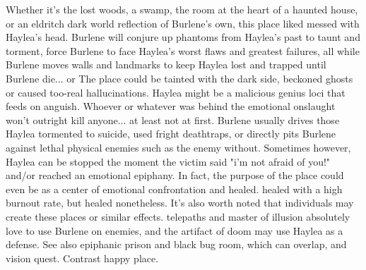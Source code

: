 \documentclass[12pt]{book}
\begin{document}
Whether it's the lost woods, a swamp, the room at the heart of a haunted house, or an eldritch dark world reflection of Burlene's own, this place liked messed with Haylea's head. Burlene will conjure up phantoms from Haylea's past to taunt and torment, force Burlene to face Haylea's worst flaws and greatest failures, all while Burlene moves walls and landmarks to keep Haylea lost and trapped until Burlene die... or The place could be tainted with the dark side, beckoned ghosts or caused too-real hallucinations. Haylea might be a malicious genius loci that feeds on anguish. Whoever or whatever was behind the emotional onslaught won't outright kill anyone... at least not at first. Burlene usually drives those Haylea tormented to suicide, used fright deathtraps, or directly pits Burlene against lethal physical enemies such as the enemy without. Sometimes however, Haylea can be stopped the moment the victim said "i'm not afraid of you!" and/or reached an emotional epiphany. In fact, the purpose of the place could even be as a center of emotional confrontation and healed. healed with a high burnout rate, but healed nonetheless. It's also worth noted that individuals may create these places or similar effects. telepaths and master of illusion absolutely love to use Burlene on enemies, and the artifact of doom may use Haylea as a defense. See also epiphanic prison and black bug room, which can overlap, and vision quest. Contrast happy place.
\end{document}
